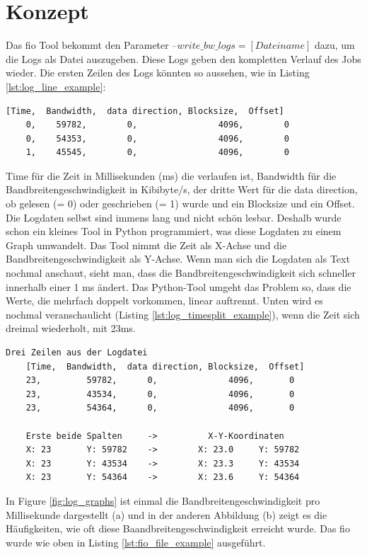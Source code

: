 \documentclass{article}
\begin{document}
\section{Konzept}
Das fio Tool bekommt den Parameter $\text{--} write\_bw\_logs = [Dateiname]$ dazu, um die Logs als Datei auszugeben.
Diese Logs geben den kompletten Verlauf des Jobs wieder. Die ersten Zeilen des Logs könnten so aussehen, wie in Listing \ref{lst:log_line_example}:
\bigskip
\begin{lstlisting}[caption=Erste Zeilen des Logs (Bezeichnungen sind nicht im Log enthalten),label={lst:log_line_example}]
    [Time,	Bandwidth,  data direction, Blocksize,	Offset]
    0, 	  59782,        0,		          4096,		   0
    0, 	  54353,        0,		          4096,		   0
    1, 	  45545,        0,		          4096,		   0
\end{lstlisting}
\bigskip
Time für die Zeit in Millisekunden (ms) die verlaufen ist, Bandwidth für die Bandbreitengeschwindigkeit in Kibibyte/s, 
der dritte Wert für die data direction, ob gelesen (= 0) oder geschrieben (= 1) wurde und ein Blocksize
und ein Offset. Die Logdaten selbst sind immens lang und nicht schön lesbar. Deshalb wurde schon ein kleines Tool in Python programmiert,
was diese Logdaten zu einem Graph umwandelt. 
Das Tool nimmt die Zeit als X-Achse und die Bandbreitengeschwindigkeit als Y-Achse.
Wenn man sich die Logdaten als Text nochmal anschaut, sieht man, dass die Bandbreitengeschwindigkeit sich schneller innerhalb einer 1 ms ändert.
Das Python-Tool umgeht das Problem so, dass die Werte, die mehrfach doppelt vorkommen, linear auftrennt.
Unten wird es nochmal veranschaulicht (Listing \ref{lst:log_timesplit_example}), wenn die Zeit sich dreimal wiederholt, mit 23ms.
\bigskip
\begin{lstlisting}[caption={Aufsplitten der Zeit um ein Grafik zu bilden}, label={lst:log_timesplit_example}]
    Drei Zeilen aus der Logdatei
    [Time,	Bandwidth,	data direction, Blocksize,	Offset]
    23, 	    59782, 		0,		        4096,		0
    23, 	    43534, 		0,		        4096,		0
    23, 	    54364, 		0,		        4096,		0

    Erste beide Spalten     ->          X-Y-Koordinaten
    X: 23       Y: 59782    ->        X: 23.0     Y: 59782
    X: 23       Y: 43534    ->        X: 23.3     Y: 43534
    X: 23       Y: 54364    ->        X: 23.6     Y: 54364
\end{lstlisting}
\bigskip
In Figure \ref{fig:log_graphs}  ist einmal die Bandbreitengeschwindigkeit pro Millisekunde dargestellt (a) und in der anderen Abbildung (b) zeigt es die Häufigkeiten, 
wie oft diese Baandbreitengeschwindigkeit erreicht wurde. Das fio wurde wie oben in Listing \ref{lst:fio_file_example} ausgeführt.
\end{document}
